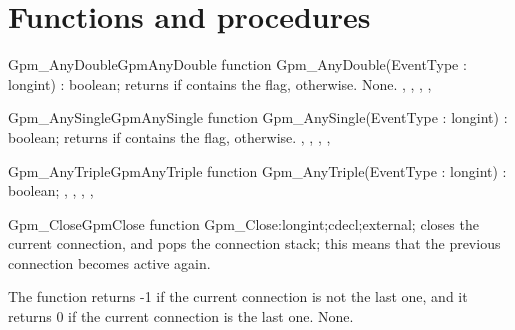 \section{Functions and procedures}

\begin{functionl}{Gpm\_AnyDouble}{GpmAnyDouble}
\Declaration
function Gpm\_AnyDouble(EventType : longint) : boolean;
\Description
{} returns  if  contains
the  flag,  otherwise.
\Errors
None.
\SeeAlso
{},
,
,
,
\end{functionl}

\begin{functionl}{Gpm\_AnySingle}{GpmAnySingle}
\Declaration
function Gpm\_AnySingle(EventType : longint) : boolean;
\Description
{} returns  if  contains
the  flag,  otherwise. 
\Errors
\SeeAlso
{},
,
,
,
\end{functionl}

\begin{functionl}{Gpm\_AnyTriple}{GpmAnyTriple}
\Declaration
function Gpm\_AnyTriple(EventType : longint) : boolean;
\Description
\Errors
\SeeAlso
{},
,
,
,
\end{functionl}

\begin{functionl}{Gpm\_Close}{GpmClose}
\Declaration
function Gpm\_Close:longint;cdecl;external;
\Description
{} closes the current connection, and pops the connection
stack; this means that the previous connection becomes active again.

The function returns -1 if the current connection is not the last one,
and it returns 0 if the current connection is the last one.
\Errors
None.
\SeeAlso
{}
\end{functionl}

